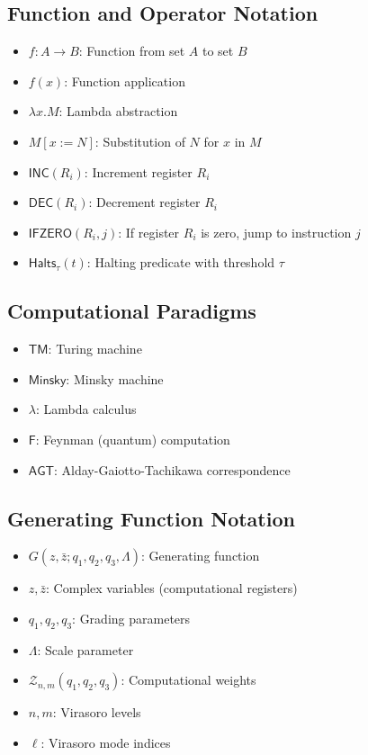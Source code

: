 \subsection{Function and Operator Notation}
\begin{itemize}
\item $f: A \to B$: Function from set $A$ to set $B$
\item $f(x)$: Function application
\item $\lambda x.M$: Lambda abstraction
\item $M[x := N]$: Substitution of $N$ for $x$ in $M$
\item $\mathsf{INC}(R_i)$: Increment register $R_i$
\item $\mathsf{DEC}(R_i)$: Decrement register $R_i$
\item $\mathsf{IFZERO}(R_i, j)$: If register $R_i$ is zero, jump to instruction $j$
\item $\mathsf{Halts}_\tau(t)$: Halting predicate with threshold $\tau$
\end{itemize}

\subsection{Computational Paradigms}
\begin{itemize}
\item $\mathsf{TM}$: Turing machine
\item $\mathsf{Minsky}$: Minsky machine
\item $\lambda$: Lambda calculus
\item $\mathsf{F}$: Feynman (quantum) computation
\item $\mathsf{AGT}$: Alday-Gaiotto-Tachikawa correspondence
\end{itemize}

\subsection{Generating Function Notation}
\begin{itemize}
\item $G(z,\bar{z};q_1,q_2,q_3,\Lambda)$: Generating function
\item $z, \bar{z}$: Complex variables (computational registers)
\item $q_1, q_2, q_3$: Grading parameters
\item $\Lambda$: Scale parameter
\item $\mathcal{Z}_{n,m}(q_1,q_2,q_3)$: Computational weights
\item $n, m$: Virasoro levels
\item $\ell$: Virasoro mode indices
\end{itemize}

